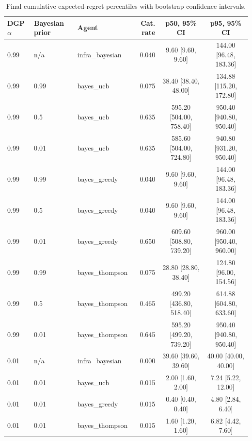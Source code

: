 \begin{table}[t]
\centering
\small
\begin{tabular}{lll rcc}
\toprule
DGP $\alpha$ & Bayesian prior & Agent & Cat. rate & p50, 95\% CI & p95, 95\% CI \\
\midrule
0.99 & n/a & infra\_bayesian & 0.040 & 9.60 [9.60, 9.60] & 144.00 [96.48, 183.36] \\
0.99 & 0.99 & bayes\_ucb & 0.075 & 38.40 [38.40, 48.00] & 134.88 [115.20, 172.80] \\
0.99 & 0.5 & bayes\_ucb & 0.635 & 595.20 [504.00, 758.40] & 950.40 [940.80, 950.40] \\
0.99 & 0.01 & bayes\_ucb & 0.635 & 585.60 [504.00, 724.80] & 940.80 [931.20, 950.40] \\
0.99 & 0.99 & bayes\_greedy & 0.040 & 9.60 [9.60, 9.60] & 144.00 [96.48, 183.36] \\
0.99 & 0.5 & bayes\_greedy & 0.040 & 9.60 [9.60, 9.60] & 144.00 [96.48, 183.36] \\
0.99 & 0.01 & bayes\_greedy & 0.650 & 609.60 [508.80, 739.20] & 960.00 [950.40, 960.00] \\
0.99 & 0.99 & bayes\_thompson & 0.075 & 28.80 [28.80, 38.40] & 124.80 [96.00, 154.56] \\
0.99 & 0.5 & bayes\_thompson & 0.465 & 499.20 [436.80, 518.40] & 614.88 [604.80, 633.60] \\
0.99 & 0.01 & bayes\_thompson & 0.645 & 595.20 [499.20, 739.20] & 950.40 [940.80, 950.40] \\
0.01 & n/a & infra\_bayesian & 0.000 & 39.60 [39.60, 39.60] & 40.00 [40.00, 40.00] \\
0.01 & 0.01 & bayes\_ucb & 0.015 & 2.00 [1.60, 2.00] & 7.24 [5.22, 12.00] \\
0.01 & 0.01 & bayes\_greedy & 0.015 & 0.40 [0.40, 0.40] & 4.80 [2.84, 6.40] \\
0.01 & 0.01 & bayes\_thompson & 0.015 & 1.60 [1.20, 1.60] & 6.82 [4.42, 7.60] \\
\bottomrule
\end{tabular}
\caption{Final cumulative expected-regret percentiles with bootstrap confidence intervals.}
\label{tab:trap-bandit-results}
\end{table}
